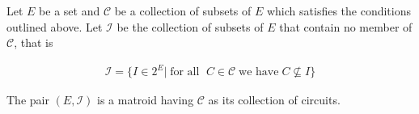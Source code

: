 \begin{theorem}\label{thm:matroid-circuit-definition}
Let $E$ be a set and $\mathcal C$ be a collection of subsets of $E$ which satisfies the conditions outlined above. Let  $\mathcal I$  be the collection of subsets of $E$ that contain no member of $\mathcal C$, that is 

\begin{align}
   \mathcal{I} = \{I \in 2^E |\; \text{for all } \; C \in \mathcal{C}\; \text{we have} \; C \not\subseteq I\}
    \label{independent-sets-from-circuits}
\end{align}

    The pair $(E,\mathcal I)$ is a matroid having $\mathcal C$ as its collection of circuits.
\end{theorem}


